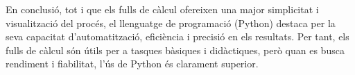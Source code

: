 En conclusió, tot i que els fulls de càlcul ofereixen una major simplicitat i visualització del procés, el llenguatge de programació (Python) destaca per la seva capacitat d’automatització, eficiència i precisió en els resultats. Per tant, els fulls de càlcul són útils per a tasques bàsiques i didàctiques, però quan es busca rendiment i fiabilitat, l’ús de Python és clarament superior.























